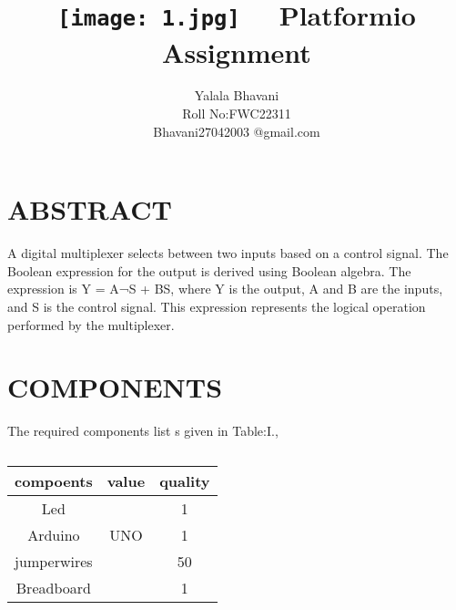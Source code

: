 \documentclass[conference]{IEEEtran}
\title{
\vspace{1cm}
{\texttt{[image: 1.jpg]} \
\ Platformio Assignment} }                              \author{Yalala Bhavani \\ Roll No:FWC22311\\Bhavani27042003 @gmail.com}
\begin{document}
\maketitle
   \section {ABSTRACT}
A digital multiplexer selects between two inputs based on a control signal. The Boolean expression for the output is derived using Boolean algebra. The expression is Y = A¬S + BS, where Y is the output, A and B are the inputs, and S is the control signal. This expression represents the logical operation performed by the multiplexer.

\section{COMPONENTS}
The required components list s given in Table:I.,
\vspace{0.3cm}                     
\begin{table} [htbp]                      
\centering                            
\begin{tabular}{| c| c | c |} \hline      
compoents & value & quality \\\hline   
Led & & 1 \\ \hline                    
Arduino & UNO & 1\\ \hline                
jumperwires & & 50 \\
\hline             
Breadboard & & 1 \\
\hline
\end{tabular}                             
\vspace{0.3cm}
\caption{\label{tab:widgets}}            
\end{table} 
\end{document}
